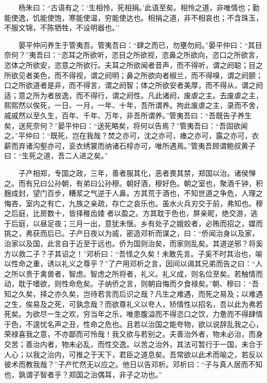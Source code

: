 　　杨朱曰：``古语有之：`生相怜，死相捐。'此语至矣。相怜之道，非唯情也；勤能使逸，饥能使饱，寒能使温，穷能使达也。相捐之道，非不相哀也；不含珠玉，不服文锦，不陈牺牲，不设明器也。''

　　晏平仲问养生于管夷吾。管夷吾曰：``肆之而已，勿壅勿阏。''晏平仲曰：``其目奈何？''夷吾曰：``恣耳之所欲听，恣目之所欲视，恣鼻之所欲向，恣口之所欲言，恣体之所欲安，恣意之所欲行。夫耳之所欲闻者音声，而不得听，谓之阏聪；目之所欲见者美色，而不得视，谓之阏明；鼻之所欲向者椒兰，而不得嗅，谓之阏颤；口之所欲道者是非，而不得言，谓之阏智；体之所欲安者美厚，而不得从，谓之阏适；意之所为者放逸，而不得行，谓之阏性。凡此诸阏，废虐之主。去废虐之主，熙熙然以俟死，一日、一月，一年、十年，吾所谓养。拘此废虐之主，录而不舍，戚戚然以至久生，百年、千年、万年，非吾所谓养。''管夷吾曰：``吾既告子养生矣，送死奈何？''晏平仲曰：``送死略矣，将何以告焉？''管夷吾曰：``吾固欲闻之。''平仲曰：``既死，岂在我哉？焚之亦可，沈之亦可，瘗之亦可，露之亦可，衣薪而弃诸沟壑亦可，衮衣绣裳而纳诸石椁亦可，唯所遇焉。''管夷吾顾谓鲍叔黄子曰：``生死之道，吾二人进之矣。''

　　子产相郑，专国之政，三年，善者服其化，恶者畏其禁，郑国以治。诸侯惮之。而有兄曰公孙朝，有弟曰公孙穆。朝好酒，穆好色。朝之室也，聚酒千钟，积麹成封，望门百步，糟浆之气逆于人鼻。方其荒于酒也，不知世道之争危，人理之悔吝，室内之有亡，九族之亲疏，存亡之哀乐也。虽水火兵刃交于前，弗知也。穆之后庭，比房数十，皆择稚齿婑者以盈之。方其耽于色也，屏亲昵，绝交游，逃于后庭，以昼足夜；三月一出，意犹未惬。乡有处子之娥姣者，必贿而招之，媒而挑之，弗获而后已。子产日夜以为戚，密造邓析而谋之，曰：``侨闻治身以及家，治家以及国，此言自于近至于远也。侨为国则治矣，而家则乱矣。其道逆邪？将奚方以救二子？子其诏之！''邓析曰：``吾怪之久矣！未敢先言。子奚不时其治也，喻以性命之重，诱以礼义之尊乎？''了产用邓析之言，因间以谒其兄弟而告之曰：``人之所以贵于禽兽者，智虑。智虑之所将者，礼义。礼义成，则名位至矣。若触情而动，耽于嗜欲，则性命危矣。子纳侨之言，则朝自悔而夕食禄矣。''朝、穆曰：``吾知之久矣，择之亦久矣，岂待若言而后识之哉？凡生之难遇，而死之易及；以难遇之生，俟易及之死，可孰念哉？而欲尊礼义以夸人，矫情性以招名，吾以此为弗若死矣。为欲尽一生之欢，穷当年之乐，唯患腹溢而不得恣口之饮，力惫而不得肆情于色，不遑忧名声之丑，性命之危也。且若以治国之能夸物，欲以说辞乱我之心，荣禄喜我之意，不亦鄙而可怜哉！我又欲与若别之。夫善治外者，物未必治，而身交苦；善治内者，物未必乱，而性交逸。以苦之治外，其法可暂行于一国，未合于人心；以我之治内，可推之于天下，君臣之道息矣。吾常欲以此术而喻之，若反以彼术而教我哉？''子产忙然无以应之。他日以告邓析。邓析曰：``子与真人居而不知也，孰谓子智者乎？郑国之治偶耳，非子之功也。''

